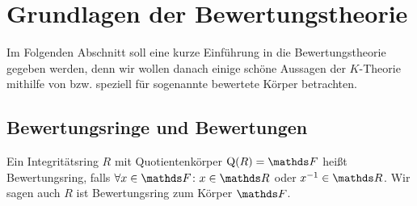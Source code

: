 \documentclass[ngerman,fontsize=11pt, paper=a4, parskip=half, titlepage=true, toc=bib]{scrartcl}
\begin{document}

\section{Grundlagen der Bewertungstheorie}

Im Folgenden Abschnitt soll eine kurze Einführung in die
Bewertungstheorie gegeben werden, denn wir wollen danach einige schöne
Aussagen der $K$-Theorie mithilfe von bzw. speziell für sogenannte
bewertete Körper betrachten.

\subsection{Bewertungsringe und Bewertungen}


\begin{Def}[Bewertungsring]\label{defbewertungsring}
  Ein Integritätsring $R$ mit Quotientenkörper $\Quot(R)=\F$ heißt
  Bewertungsring, falls $\forall x\in\F\colon x\in\R$ oder
  $x^{-1}\in\R$.
  Wir sagen auch $R$ ist Bewertungsring zum Körper $\F$.
\end{Def}
\end{document}
